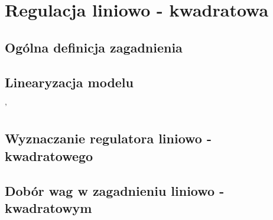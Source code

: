 \section{Regulacja liniowo - kwadratowa}
\label{sec:lqr}


\subsection{Ogólna definicja zagadnienia}
\label{sub:lqr-def}


\subsection{Linearyzacja modelu}'
\label{sub:lqr-lin}


\subsection{Wyznaczanie regulatora liniowo - kwadratowego}
\label{sub:lqr-ctrl}


\subsection{Dobór wag w zagadnieniu liniowo - kwadratowym}
\label{sub:lqr-weights}
